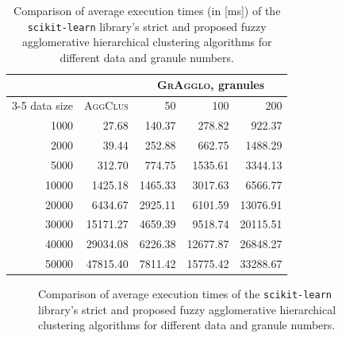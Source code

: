 \documentclass{amcs}
\newcommand{\procedura}[1]{\textsc{#1}}
\newcommand{\abbrAgglomerativeClustering}{\procedura{AggClus}}
\newcommand{\MojAlg}{\procedura{GrAgglo}}
\begin{document}
 \begin{table}
 	\centering
 	\caption{Comparison of average execution times (in [ms]) of the \texttt{scikit-learn} library's strict and proposed fuzzy agglomerative hierarchical clustering algorithms for different data and granule numbers.}
 	\label{id:tab:comparing-times-sklearn}
 	\begin{tabular}{rrrrr}
 		\toprule
                &  & \multicolumn{3}{c}{\MojAlg, granules} \\
      \cmidrule(lr){3-5}
 		data size & \abbrAgglomerativeClustering & 50  & 100  & 200   \\
 		\midrule
 		 1000 &    27.68 &  140.37 &   278.82 &   922.37 \\
		 2000 &    39.44 &  252.88 &   662.75 &  1488.29 \\
	 	 5000 &   312.70 &  774.75 &  1535.61 &  3344.13 \\
		10000 &  1425.18 & 1465.33 &  3017.63 &  6566.77 \\
		20000 &  6434.67 & 2925.11 &  6101.59 & 13076.91 \\
		30000 & 15171.27 & 4659.39 &  9518.74 & 20115.51 \\
		40000 & 29034.08 & 6226.38 & 12677.87 & 26848.27 \\
		50000 & 47815.40 & 7811.42 & 15775.42 & 33288.67 \\
 		\bottomrule
 	\end{tabular}
 \end{table}
\begin{figure}
 \centering
 	\caption{Comparison of average execution times of the \texttt{scikit-learn} library's strict and proposed fuzzy agglomerative hierarchical clustering algorithms for different data and granule numbers.}
 	\label{id:fig:comparing-times-sklearn}
\end{figure}
 
\end{document}

